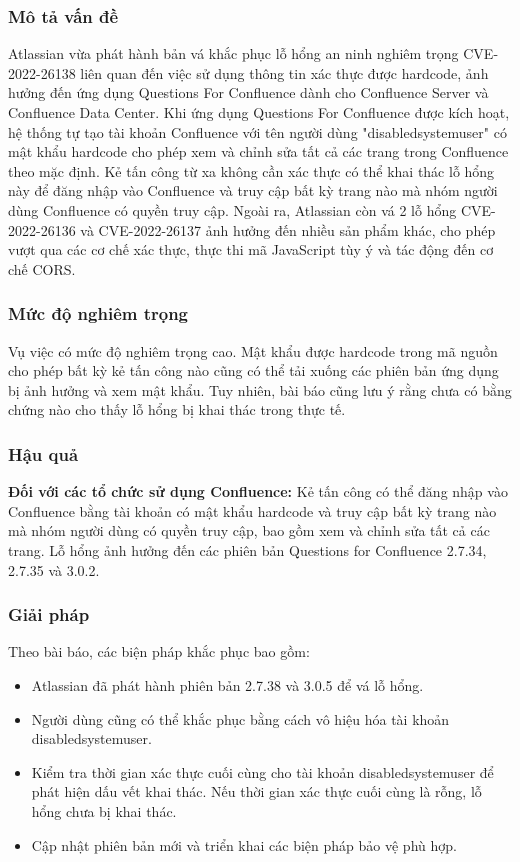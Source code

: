 \subsubsection{Mô tả vấn đề}
Atlassian vừa phát hành bản vá khắc phục lỗ hổng an ninh nghiêm trọng CVE-2022-26138 liên quan đến việc sử dụng thông tin xác thực được hardcode, ảnh hưởng đến ứng dụng Questions For Confluence dành cho Confluence Server và Confluence Data Center. Khi ứng dụng Questions For Confluence được kích hoạt, hệ thống tự tạo tài khoản Confluence với tên người dùng "disabledsystemuser" có mật khẩu hardcode cho phép xem và chỉnh sửa tất cả các trang trong Confluence theo mặc định. Kẻ tấn công từ xa không cần xác thực có thể khai thác lỗ hổng này để đăng nhập vào Confluence và truy cập bất kỳ trang nào mà nhóm người dùng Confluence có quyền truy cập. Ngoài ra, Atlassian còn vá 2 lỗ hổng CVE-2022-26136 và CVE-2022-26137 ảnh hưởng đến nhiều sản phẩm khác, cho phép vượt qua các cơ chế xác thực, thực thi mã JavaScript tùy ý và tác động đến cơ chế CORS.

\subsubsection{Mức độ nghiêm trọng}
Vụ việc có mức độ nghiêm trọng cao. Mật khẩu được hardcode trong mã nguồn cho phép bất kỳ kẻ tấn công nào cũng có thể tải xuống các phiên bản ứng dụng bị ảnh hưởng và xem mật khẩu. Tuy nhiên, bài báo cũng lưu ý rằng chưa có bằng chứng nào cho thấy lỗ hổng bị khai thác trong thực tế.

\subsubsection{Hậu quả}
\textbf{Đối với các tổ chức sử dụng Confluence:} Kẻ tấn công có thể đăng nhập vào Confluence bằng tài khoản có mật khẩu hardcode và truy cập bất kỳ trang nào mà nhóm người dùng có quyền truy cập, bao gồm xem và chỉnh sửa tất cả các trang. Lỗ hổng ảnh hưởng đến các phiên bản Questions for Confluence 2.7.34, 2.7.35 và 3.0.2.

\subsubsection{Giải pháp}
Theo bài báo, các biện pháp khắc phục bao gồm:

\begin{itemize}
    \item Atlassian đã phát hành phiên bản 2.7.38 và 3.0.5 để vá lỗ hổng.
    \item Người dùng cũng có thể khắc phục bằng cách vô hiệu hóa tài khoản disabledsystemuser.
    \item Kiểm tra thời gian xác thực cuối cùng cho tài khoản disabledsystemuser để phát hiện dấu vết khai thác. Nếu thời gian xác thực cuối cùng là rỗng, lỗ hổng chưa bị khai thác.
    \item Cập nhật phiên bản mới và triển khai các biện pháp bảo vệ phù hợp.
\end{itemize}

